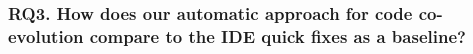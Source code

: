 	

	
	
	\subsubsection{RQ3. How does our automatic approach for code co-evolution compare to the IDE quick fixes as a baseline?} 
	
